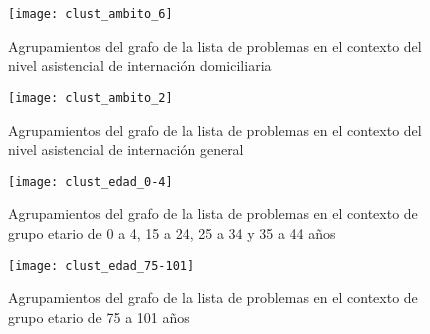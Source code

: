 \begin{figure}[ht]
\caption{Agrupamientos del grafo de la lista de problemas en el contexto del nivel asistencial de internación domiciliaria }
\label{fig:clust_ambito_inter_domici}
\centering
\texttt{[image: clust\_ambito\_6]}
\end{figure}

\begin{figure}[ht]
\caption{Agrupamientos del grafo de la lista de problemas en el contexto del nivel asistencial de internación general }
\label{fig:clust_ambito_inter_general}
\centering
\texttt{[image: clust\_ambito\_2]}
\end{figure}

\begin{figure}[ht]
\caption{Agrupamientos del grafo de la lista de problemas en el contexto de grupo etario de 0 a 4, 15 a 24, 25 a 34 y 35 a 44 años }
\label{fig:clust_edad_0_4}
\centering
\texttt{[image: clust\_edad\_0-4]}
\end{figure}

\begin{figure}[ht]
\caption{Agrupamientos del grafo de la lista de problemas en el contexto de grupo etario de 75 a 101 años }
\label{fig:clust_edad_75_101}
\centering
\texttt{[image: clust\_edad\_75-101]}
\end{figure}
